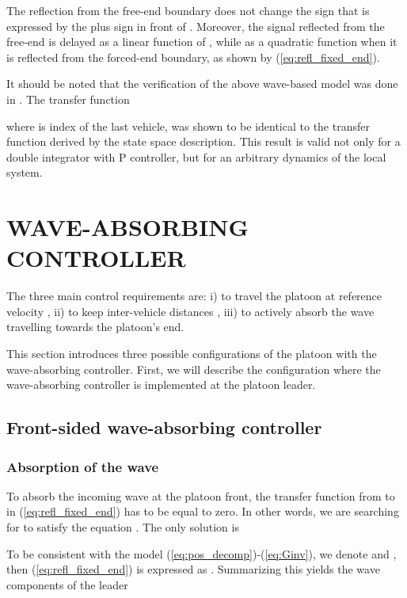 \documentclass[final,5p,times,twocolumn]{elsarticle}
\begin{document}
The reflection from the free-end boundary does not change the sign that is expressed by the plus sign in front of . Moreover, the signal reflected from the free-end is delayed as a linear function of , while as a quadratic function when it is reflected from the forced-end boundary, as shown by (\ref{eq:refl_fixed_end}).

It should be noted that the verification of the above wave-based model was done in \cite{OConnor2007}. The transfer function

where  is index of the last vehicle, was shown to be identical to the transfer function derived by the state space description. This result is valid not only for a double integrator with P controller, but for an arbitrary dynamics of the local system.

\section{WAVE-ABSORBING CONTROLLER}
\label{sec:wave-based_platoon_control}

The three main control requirements are: i) to travel the platoon at reference velocity , ii) to keep inter-vehicle distances , iii) to actively absorb the wave travelling towards the platoon's end.

This section introduces three possible configurations of the platoon with the wave-absorbing controller. First, we will describe the configuration where the wave-absorbing controller is implemented at the platoon leader.

\subsection{Front-sided wave-absorbing controller}
\label{sec:driving_ref_vel}

\subsubsection{Absorption of the wave}
\label{subsec:wave_absorption}

To absorb the incoming wave at the platoon front, the transfer function from  to  in (\ref{eq:refl_fixed_end}) has to be equal to zero. In other words, we are searching for  to satisfy the equation . The only solution is

To be consistent with the model (\ref{eq:pos_decomp})-(\ref{eq:Ginv}), we denote  and , then (\ref{eq:refl_fixed_end}) is expressed as . Summarizing this yields the wave components of the leader
\end{document}
